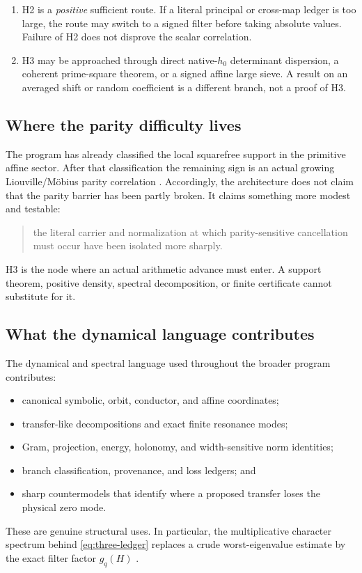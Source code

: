 \begin{enumerate}[leftmargin=2em]
\item H2 is a \emph{positive} sufficient route.  If a literal
  principal or cross-map ledger is too large, the route may switch to
  a signed filter before taking absolute values.  Failure of H2 does
  not disprove the scalar correlation.
\item H3 may be approached through direct native-\(h_0\) determinant
  dispersion, a coherent prime-square theorem, or a signed affine
  large sieve.  A result on an averaged shift or random coefficient
  is a different branch, not a proof of H3.
\end{enumerate}

\subsection{Where the parity difficulty lives}

The program has already classified the local squarefree support in
the primitive affine sector.  After that classification the remaining
sign is an actual growing Liouville/M\"obius parity correlation
\cite{WangTPC90}.  Accordingly, the architecture does not claim that
the parity barrier has been partly broken.  It claims something more
modest and testable:
\begin{quote}
the literal carrier and normalization at which parity-sensitive
cancellation must occur have been isolated more sharply.
\end{quote}
H3 is the node where an actual arithmetic advance must enter.  A
support theorem, positive density, spectral decomposition, or finite
certificate cannot substitute for it.

\subsection{What the dynamical language contributes}

The dynamical and spectral language used throughout the broader
program contributes:
\begin{itemize}[leftmargin=2em]
\item canonical symbolic, orbit, conductor, and affine coordinates;
\item transfer-like decompositions and exact finite resonance modes;
\item Gram, projection, energy, holonomy, and width-sensitive norm
  identities;
\item branch classification, provenance, and loss ledgers; and
\item sharp countermodels that identify where a proposed transfer
  loses the physical zero mode.
\end{itemize}
These are genuine structural uses.  In particular, the multiplicative
character spectrum behind \eqref{eq:three-ledger} replaces a crude
worst-eigenvalue estimate by the exact filter factor \(g_q(H)\)
\cite{WangTPC99,WangTPC101}.

